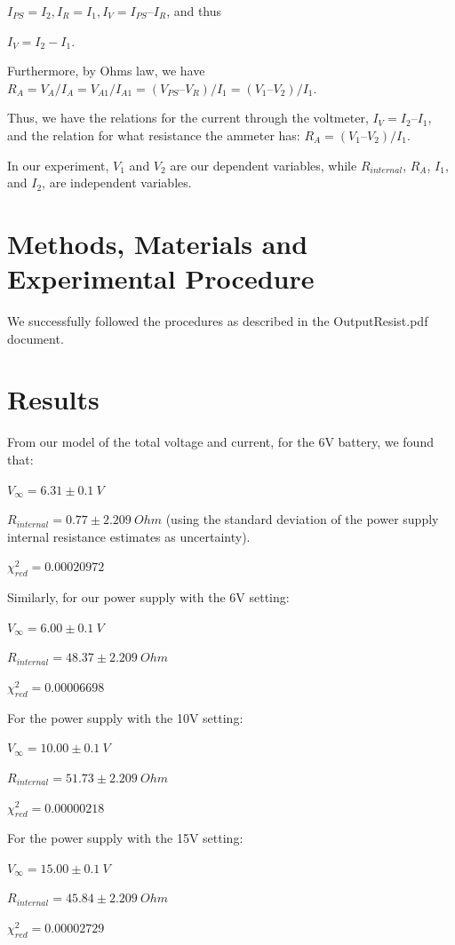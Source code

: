 \documentclass[letterpaper,12pt]{article}
\begin{document}
$I_{PS} = I_2, I_R = I_1, I_V = I_{PS} – I_R$, and thus 

$I_V = I_2 - I_1.$

Furthermore, by Ohms law, we have 
$R_A = V_A / I_A = V_{A1} / I_{A1} = (V_{PS} – V_R)/I_1 = (V_1 – V_2)/ I_1.$

Thus, we have the relations for the current through the voltmeter, $I_V = I_2 – I_1$, 
and the relation for what resistance the ammeter has: $R_A =  (V_1 – V_2)/ I_1$.

In our experiment, $V_1$ and $V_2$ are our dependent variables, while $R_{internal}$, $R_A$, $I_1$, and $I_2$, are independent variables.

\section{Methods, Materials and Experimental Procedure}

We successfully followed the procedures as described in the OutputResist.pdf document.

\section{Results}

From our model of the total voltage and current, for the 6V battery, we found that:

$V_{\infty} = 6.31 \pm 0.1\ V$

$R_{internal} = 0.77 \pm 2.209\ Ohm$ (using the standard deviation of the power supply internal resistance estimates as uncertainty).

$\chi_{red}^2 = 0.00020972$

Similarly, for our power supply with the 6V setting:

$V_{\infty} = 6.00 \pm 0.1\ V$

$R_{internal} = 48.37 \pm 2.209\ Ohm$

$\chi_{red}^2 = 0.00006698$

For the power supply with the 10V setting:

$V_{\infty} = 10.00 \pm 0.1\ V$

$R_{internal} = 51.73 \pm 2.209\ Ohm$

$\chi_{red}^2 = 0.00000218$

For the power supply with the 15V setting:

$V_{\infty} = 15.00 \pm 0.1\ V$

$R_{internal} = 45.84 \pm 2.209\ Ohm$

$\chi_{red}^2 = 0.00002729$
\end{document}
